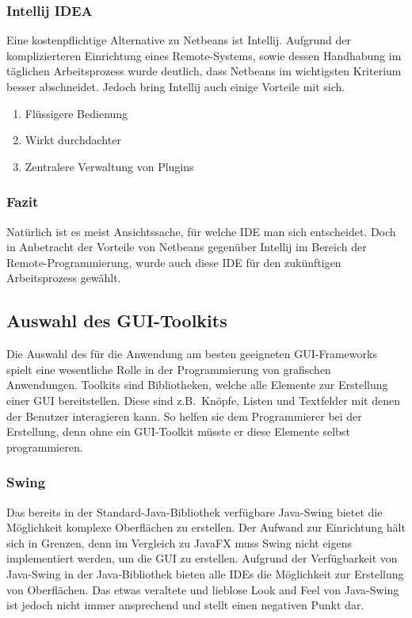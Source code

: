 \subsubsection{Intellij IDEA}
Eine kostenpflichtige Alternative zu Netbeans ist Intellij.
Aufgrund der komplizierteren Einrichtung eines Remote-Systems, sowie dessen Handhabung im täglichen Arbeitsprozess wurde deutlich, dass Netbeans im wichtigsten Kriterium besser abschneidet.
Jedoch bring Intellij auch einige Vorteile mit sich.
\begin{enumerate}
    \item Flüssigere Bedienung
    \item Wirkt durchdachter
    \item Zentralere Verwaltung von Plugins
\end{enumerate}
\subsubsection{Fazit}
Natürlich ist es meist Ansichtssache, für welche IDE man sich entscheidet.
Doch in Anbetracht der Vorteile von Netbeans gegenüber Intellij im Bereich der Remote-Programmierung, wurde auch diese IDE für den zukünftigen Arbeitsprozess gewählt.
\subsection{Auswahl des GUI-Toolkits}\label{subsec:auswahl-des-gui-frameworks}
Die Auswahl des für die Anwendung am besten geeigneten GUI-Frameworks spielt eine wesentliche Rolle in der Programmierung von grafischen Anwendungen.
Toolkits sind Bibliotheken, welche alle Elemente zur Erstellung einer GUI bereitstellen.
Diese sind z.B.\ Knöpfe, Listen und Textfelder mit denen der Benutzer interagieren kann.
So helfen sie dem Programmierer bei der Erstellung, denn ohne ein GUI-Toolkit müsste er diese Elemente selbst programmieren.
\subsubsection{Swing}
Das bereits in der Standard-Java-Bibliothek verfügbare Java-Swing bietet die Möglichkeit komplexe Oberflächen zu erstellen.
Der Aufwand zur Einrichtung hält sich in Grenzen, denn im Vergleich zu JavaFX muss Swing nicht eigens implementiert werden, um die GUI zu erstellen.
Aufgrund der Verfügbarkeit von Java-Swing in der Java-Bibliothek bieten alle IDEs die Möglichkeit zur Erstellung von Oberflächen.
Das etwas veraltete und lieblose Look and Feel von Java-Swing ist jedoch nicht immer ansprechend und stellt einen negativen Punkt dar.
